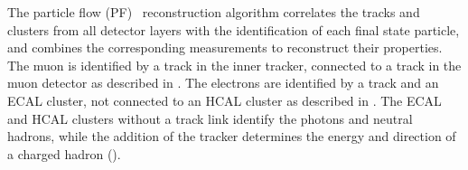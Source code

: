 The particle flow (PF)~\cite{CMS-PRF-14-001} reconstruction algorithm correlates the tracks and clusters from all detector layers with the identification of each final state particle, and combines the corresponding measurements to reconstruct their properties. The muon is identified by a track in the inner tracker, connected to a track in the muon detector as described in . The electrons are identified by a track and an ECAL cluster, not connected to an HCAL cluster as described in . The ECAL and HCAL clusters without a track link identify the photons and neutral hadrons, while the addition of the tracker determines the energy and direction of a charged hadron (). 



